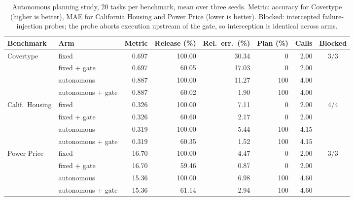 \documentclass[preprint,12pt,authoryear]{elsarticle}
\begin{document}
\begin{table}[t]
    \centering
    \caption{Autonomous planning study, 20 tasks per benchmark, mean over three seeds. Metric: accuracy for Covertype (higher is better), MAE for California Housing and Power Price (lower is better). Blocked: intercepted failure-injection probes; the probe aborts execution upstream of the gate, so interception is identical across arms.}
    \label{tab:autonomous}
    \scriptsize
    \setlength{\tabcolsep}{2.5pt}
    \renewcommand{\arraystretch}{1.15}
    \begin{tabular}{@{}llrrrrrc@{}}
        \toprule
        \textbf{Benchmark} & \textbf{Arm}
        & \textbf{Metric} & \textbf{Release (\%)} & \textbf{Rel.\ err.\ (\%)}
        & \textbf{Plan (\%)} & \textbf{Calls} & \textbf{Blocked} \\
        \midrule
        \multirow{4}{*}{Covertype}
        & fixed                & 0.697 & 100.00 & 30.34 &   0 & 2.00 & \multirow{4}{*}{3/3} \\
        & fixed + gate         & 0.697 &  60.05 & 17.03 &   0 & 2.00 & \\
        & autonomous           & 0.887 & 100.00 & 11.27 & 100 & 4.00 & \\
        & autonomous + gate    & 0.887 &  60.02 &  1.90 & 100 & 4.00 & \\
        \midrule
        \multirow{4}{*}{Calif.\ Housing}
        & fixed                & 0.326 & 100.00 &  7.11 &   0 & 2.00 & \multirow{4}{*}{4/4} \\
        & fixed + gate         & 0.326 &  60.60 &  2.17 &   0 & 2.00 & \\
        & autonomous           & 0.319 & 100.00 &  5.44 & 100 & 4.15 & \\
        & autonomous + gate    & 0.319 &  60.35 &  1.52 & 100 & 4.15 & \\
        \midrule
        \multirow{4}{*}{Power Price}
        & fixed                & 16.70 & 100.00 &  4.47 &   0 & 2.00 & \multirow{4}{*}{3/3} \\
        & fixed + gate         & 16.70 &  59.46 &  0.87 &   0 & 2.00 & \\
        & autonomous           & 15.36 & 100.00 &  6.98 & 100 & 4.60 & \\
        & autonomous + gate    & 15.36 &  61.14 &  2.94 & 100 & 4.60 & \\
        \bottomrule
    \end{tabular}
\end{table}
\end{document}
